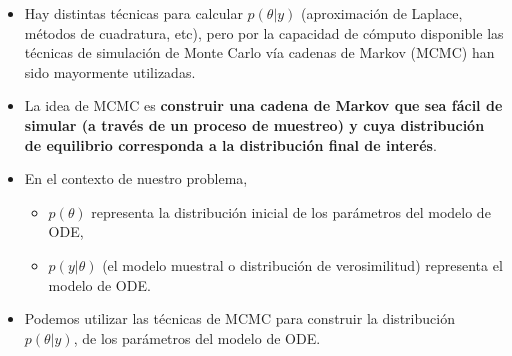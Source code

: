 \documentclass[11pt]{beamer}
\begin{document}
\begin{frame}\small
	\begin{itemize}
		\item Hay distintas técnicas para calcular $p(\theta | y) $ (aproximación de Laplace, métodos de cuadratura, etc), pero por la capacidad de cómputo disponible las técnicas de simulación de Monte Carlo vía cadenas de Markov (MCMC) han sido mayormente utilizadas.
		\item La idea de MCMC es \textbf{construir una cadena de Markov que sea fácil de simular (a través de un proceso de muestreo) y cuya distribución de equilibrio corresponda a la distribución final de interés}.
	\end{itemize}
\end{frame}

\begin{frame}
	\begin{itemize}
		\item En el contexto de nuestro problema,
		\begin{itemize}
			\item $p(\theta)$ representa la distribución inicial de los parámetros del modelo de ODE, 
			\item $p(y|\theta)$ (el modelo muestral o distribución de verosimilitud) representa el modelo de ODE. 
		\end{itemize}	
		
		\item Podemos utilizar las técnicas de MCMC para construir la distribución $p(\theta|y)$, de los parámetros del modelo de ODE.  
	\end{itemize}
\end{frame}
\end{document}
